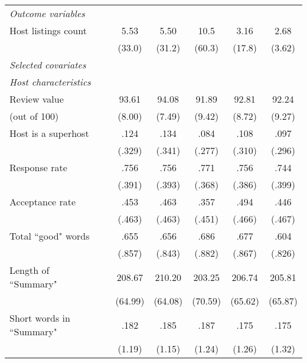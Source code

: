 {\begin{longtable}{l*{6}{c}}
		\textit{Outcome variables} \\
		Host listings count         & &      5.53&      5.50 &      10.5&    3.16 & 2.68\\
		&	&     (33.0)         &     (31.2)         &     (60.3)         &     (17.8) & 	(3.62)         \\
		[1em]
		\textit{Selected covariates} \\
		\hline\hline
		\textit{Host characteristics} \\
		\hline
		Review value      &   &      93.61	&      94.08	 	&      91.89		&    92.81	 & 		92.24\\
		(out of 100)              &      &     (8.00)         &     (7.49)         &     (9.42)         &     (8.72) 	&	 (9.27)         \\
		[1em]
		Host is a superhost    &    &      .124		&      .134&      .084 &      .108  	& 	.097\\
		& & (.329)     &     (.341)         &     (.277)         &     (.310)         &     (.296)         \\
		[1em]
		Response rate      &   &       .756		&       .756		&      .771         &      .756  	& 	.744\\
		& &     (.391)         &     (.393)         &     (.368)         &     (.386)         &		(.399)\\
		[1em]
		Acceptance rate      &     &      .453&      .463&       .357         &      .494    &	.446     \\
		& &     (.463)         &     (.463)         &     (.451)         &     (.466)         &		(.467)\\
		[1em]
		Total ``good" words       &    &      .655&      .656&       .686         &      .677    &	.604     \\
		& &     (.857)         &     (.843)         &     (.882)         &     (.867)         &		(.826)\\
		[1em]
		Length of ``Summary"      &     &      208.67 	&      210.20	&       203.25         &      206.74    &	205.81     \\
		& &       (64.99)  &    (64.08)         &     (70.59)         &     (65.62)         &     (65.87) \\
		[1em]
		Short words in ``Summary"          &  &      .182		&      .185		&       .187         &      .175    &	.175     \\
		& &     (1.19)         &     (1.15)         &     (1.24)         &     (1.26)         &		(1.32)\\                    
		

\end{longtable}}
